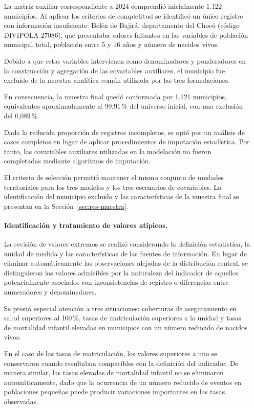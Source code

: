 La matriz auxiliar correspondiente a 2024 comprendió inicialmente 1.122 municipios. Al aplicar los criterios de completitud se identificó un único registro con información insuficiente: Belén de Bajirá, departamento del Chocó (código DIVIPOLA 27086), que presentaba valores faltantes en las variables de población municipal total, población entre 5 y 16 años y número de nacidos vivos.

Debido a que estas variables intervienen como denominadores y ponderadores en la construcción y agregación de las covariables auxiliares, el municipio fue excluido de la muestra analítica común utilizada por las tres formulaciones.

En consecuencia, la muestra final quedó conformada por 1.121 municipios, equivalentes aproximadamente al 99,91\,\% del universo inicial, con una exclusión del 0,089\,\%.

Dada la reducida proporción de registros incompletos, se optó por un análisis de casos completos en lugar de aplicar procedimientos de imputación estadística. Por tanto, las covariables auxiliares utilizadas en la modelación no fueron completadas mediante algoritmos de imputación.

El criterio de selección permitió mantener el mismo conjunto de unidades territoriales para los tres modelos y los tres escenarios de covariables. La identificación del municipio excluido y las características de la muestra final se presentan en la Sección~\ref{sec:res-muestra}.

\paragraph{Identificación y tratamiento de valores atípicos.}

La revisión de valores extremos se realizó considerando la definición estadística, la unidad de medida y las características de las fuentes de información. En lugar de eliminar automáticamente las observaciones alejadas de la distribución central, se distinguieron los valores admisibles por la naturaleza del indicador de aquellos potencialmente asociados con inconsistencias de registro o diferencias entre numeradores y denominadores.

Se prestó especial atención a tres situaciones: coberturas de aseguramiento en salud superiores al 100\,\%, tasas de matriculación superiores a la unidad y tasas de mortalidad infantil elevadas en municipios con un número reducido de nacidos vivos.

En el caso de las tasas de matriculación, los valores superiores a uno se conservaron cuando resultaban compatibles con la definición del indicador. De manera similar, las tasas elevadas de mortalidad infantil no se eliminaron automáticamente, dado que la ocurrencia de un número reducido de eventos en poblaciones pequeñas puede producir variaciones importantes en las tasas observadas.

